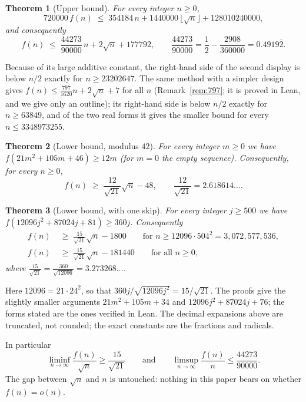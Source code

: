 \documentclass[11pt]{amsart}
\newtheorem{theorem}{Theorem}[section]
\theoremstyle{remark}
\newcommand{\isqrt}[1]{\lfloor\sqrt{#1}\rfloor}
\begin{document}
\begin{theorem}[Upper bound]\label{thm:upper}
For every integer $n\ge0$,
\[
  720000\,f(n)\;\le\;354184\,n+1440000\,\isqrt n+128010240000,
\]
and consequently
\[
  f(n)\;\le\;\frac{44273}{90000}\,n+2\sqrt n+177792,\qquad \frac{44273}{90000}=\frac12-\frac{2908}{360000}=0.4919\overline{2}.
\]
\end{theorem}

Because of its large additive constant, the right-hand side of the second display is below $n/2$ exactly for $n\ge 23202647$. The same method with a
simpler design gives $f(n)\le\frac{797}{1620}n+2\sqrt n+7$ for all $n$ (Remark~\ref{rem:797}; it is proved in Lean, and we give only an outline); its right-hand side is below $n/2$ exactly
for $n\ge63849$, and of the two real forms it gives the smaller bound for every $n\le3348973255$.

\begin{theorem}[Lower bound, modulus $42$]\label{thm:mod42}
For every integer $m\ge0$ we have $f(21m^2+105m+46)\ge 12m$ (for $m=0$ the empty sequence). Consequently, for every $n\ge0$,
\[
  f(n)\;\ge\;\frac{12}{\sqrt{21}}\sqrt n-48,\qquad \frac{12}{\sqrt{21}}=2.618614\ldots .
\]
\end{theorem}

\begin{theorem}[Lower bound, with one skip]\label{thm:skip}
For every integer $j\ge500$ we have $f(12096j^2+87024j+81)\ge 360j$. Consequently
\begin{align*}
  f(n)&\;\ge\;\frac{15}{\sqrt{21}}\sqrt n-1800\qquad\text{for } n\ge 12096\cdot504^2=3{,}072{,}577{,}536,\\
  f(n)&\;\ge\;\frac{15}{\sqrt{21}}\sqrt n-181440\qquad\text{for all } n\ge0,
\end{align*}
where $\frac{15}{\sqrt{21}}=\frac{360}{\sqrt{12096}}=3.273268\ldots$.
\end{theorem}

Here $12096=21\cdot24^2$, so that $360j/\sqrt{12096j^2}=15/\sqrt{21}$. The proofs give the slightly smaller arguments
$21m^2+105m+34$ and $12096j^2+87024j+76$; the forms stated are the ones verified in Lean. The decimal expansions above are truncated,
not rounded; the exact constants are the fractions and radicals.

In particular
\[
  \liminf_{n\to\infty}\frac{f(n)}{\sqrt n}\ge\frac{15}{\sqrt{21}}\qquad\text{and}\qquad\limsup_{n\to\infty}\frac{f(n)}{n}\le\frac{44273}{90000}.
\]
The gap between $\sqrt n$ and $n$ is untouched: nothing in this paper bears on whether $f(n)=o(n)$.
\end{document}

